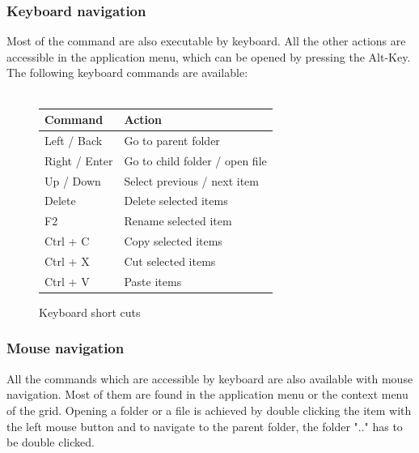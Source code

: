 \documentclass[JCDReport.tex]{subfiles}
\begin{document}
\subsubsection{Keyboard navigation}
Most of the command are also executable by keyboard. All the other actions are accessible in the application menu, which can be opened by pressing the Alt-Key.\\
The following keyboard commands are available:\\
\\

\begin{figure}[h!]
	\centering
	\begin{tabular}{| l | l |}
		\hline
		\textbf{Command} & \textbf{Action} \\ \hline \hline
		Left / Back & Go to parent folder \\ \hline
		Right / Enter & Go to child folder / open file \\ \hline
		Up / Down & Select previous / next item \\ \hline
		Delete & Delete selected items \\ \hline
		F2 & Rename selected item \\ \hline
		Ctrl + C & Copy selected items \\ \hline
		Ctrl + X & Cut selected items \\ \hline
		Ctrl + V & Paste items \\ \hline	
	\end{tabular}
	\caption{Keyboard short cuts}
\end{figure}

\subsubsection{Mouse navigation}
All the commands which are accessible by keyboard are also available with mouse navigation.
Most of them are found in the application menu or the context menu of the grid. Opening a folder or a file is achieved by double clicking the item with the left mouse button and to navigate to the parent folder, the folder ".." has to be double clicked. 
\end{document}
